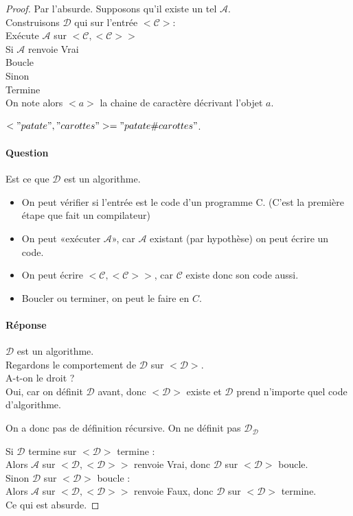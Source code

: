 \begin{proof}
	Par l'absurde. Supposons qu'il existe un tel $\mathcal A$.\\
	Construisons $\mathcal D$ qui sur l'entrée $<\mathcal C>$:\\
	\indent Exécute $\mathcal A$ sur $< \mathcal C, <\mathcal C>>$\\
	\indent Si $\mathcal A$ renvoie Vrai\\
	\indent \indent Boucle\\
	\indent Sinon\\
	\indent \indent Termine\\

On note alors $<a>$ la chaine de caractère décrivant l'objet $a$.
\begin{example}
	$<"patate", "carottes"> = "patate\#carottes"$.
\end{example}

\paragraph{Question} Est ce que $\mathcal D$ est un algorithme.
\begin{itemize}[label=$\star$]
	\item On peut vérifier si l'entrée est le code d'un programme C. (C'est la première étape que fait un compilateur)
	\item On peut «exécuter $\mathcal A$», car $\mathcal A$ existant (par hypothèse) on peut écrire un code.
	\item On peut écrire $<\mathcal C, <\mathcal C>>$, car $\mathcal C$ existe donc son code aussi.
	\item Boucler ou terminer, on peut le faire en $C$.
\end{itemize}

\paragraph{Réponse} $\mathcal D$ est un algorithme.\\

Regardons le comportement de $\mathcal D$ sur $<\mathcal D>$.\\
\indent A-t-on le droit ? \\
\indent Oui, car on définit $\mathcal D$ avant, donc $<\mathcal D>$ existe et $\mathcal D$ prend n'importe quel code d'algorithme.
\begin{com}
	On a donc pas de définition récursive. On ne définit pas $\mathcal D _{\mathcal D}$
\end{com}

\noindent Si $\mathcal D$ termine sur $<\mathcal D>$ termine :\\
\indent Alors $\mathcal A$ sur $<\mathcal D, <\mathcal D>>$ renvoie Vrai, donc $\mathcal D$ sur $<\mathcal D>$ boucle.\\
Sinon $\mathcal D$ sur $<\mathcal D>$ boucle :\\
\indent Alors $\mathcal A$ sur $<\mathcal D, <\mathcal D>>$ renvoie Faux, donc $\mathcal D$ sur $<\mathcal D>$ termine.\\
Ce qui est absurde.

\end{proof}

